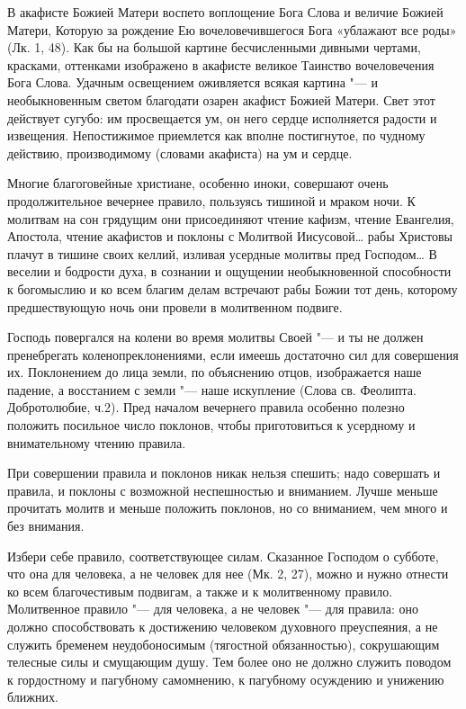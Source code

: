 В акафисте Божией Матери воспето воплощение Бога Слова и величие Божией Матери, Которую за рождение Ею вочеловечившегося Бога «ублажают все роды» (Лк. 1, 48). Как бы на большой картине бесчисленными дивными чертами, красками, оттенками изображено в акафисте великое Таинство вочеловечения Бога Слова. Удачным освещением оживляется всякая картина "--- и необыкновенным светом благодати озарен акафист Божией Матери. Свет этот действует сугубо: им просвещается ум, он него сердце исполняется радости и извещения. Непостижимое приемлется как вполне постигнутое, по чудному действию, производимому (словами акафиста) на ум и сердце.

Многие благоговейные христиане, особенно иноки, совершают очень продолжительное вечернее правило, пользуясь тишиной и мраком ночи. К молитвам на сон грядущим они присоединяют чтение кафизм, чтение Евангелия, Апостола, чтение акафистов и поклоны с Молитвой Иисусовой… рабы Христовы плачут в тишине своих келлий, изливая усердные молитвы пред Господом… В веселии и бодрости духа, в сознании и ощущении необыкновенной способности к богомыслию и ко всем благим делам встречают рабы Божии тот день, которому предшествующую ночь они провели в молитвенном подвиге.

Господь повергался на колени во время молитвы Своей "--- и ты не должен пренебрегать коленопреклонениями, если имеешь достаточно сил для совершения их. Поклонением до лица земли, по объяснению отцов, изображается наше падение, а восстанием с земли "--- наше искупление (Слова св. Феолипта. Добротолюбие, ч.2). Пред началом вечернего правила особенно полезно положить посильное число поклонов, чтобы приготовиться к усердному и внимательному чтению правила.

При совершении правила и поклонов никак нельзя спешить; надо совершать и правила, и поклоны с возможной неспешностью и вниманием. Лучше меньше прочитать молитв и меньше положить поклонов, но со вниманием, чем много и без внимания.

Избери себе правило, соответствующее силам. Сказанное Господом о субботе, что она для человека, а не человек для нее (Мк. 2, 27), можно и нужно отнести ко всем благочестивым подвигам, а также и к молитвенному правило. Молитвенное правило "--- для человека, а не человек "--- для правила: оно должно способствовать к достижению человеком духовного преуспеяния, а не служить бременем неудобоносимым (тягостной обязанностью), сокрушающим телесные силы и смущающим душу. Тем более оно не должно служить поводом к гордостному и пагубному самомнению, к пагубному осуждению и унижению ближних.

